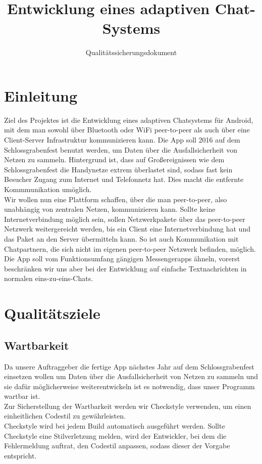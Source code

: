 \documentclass[accentcolor=tud0b,12pt,paper=a4]{tudreport}
\title{Entwicklung eines adaptiven Chat-Systems}
\subtitle{Qualitätssicherungsdokument}
\begin{document}
	\maketitle
	\tableofcontents 
	
	\chapter{Einleitung}
        Ziel des Projektes ist die Entwicklung eines adaptiven Chatsystems für Android, mit dem man sowohl über Bluetooth oder WiFi peer-to-peer als auch über eine Client-Server Infrastruktur kommunizieren kann. Die App soll 2016 auf dem Schlossgrabenfest benutzt werden, um Daten über die Ausfallsicherheit von Netzen zu sammeln. Hintergrund ist, dass auf Großereignissen wie dem Schlossgrabenfest die Handynetze extrem überlastet sind, sodass fast kein Besucher Zugang zum Internet und Telefonnetz hat. Dies macht die entfernte Kommmunikation umöglich.\\

        Wir wollen nun eine Plattform schaffen, über die man peer-to-peer, also unabhängig von zentralen Netzen, kommunizieren kann. Sollte keine Internetverbindung möglich sein, sollen Netzwerkpakete über das peer-to-peer Netzwerk weitergereicht werden, bis ein Client eine Internetverbindung hat und das Paket an den Server übermitteln kann. So ist auch Kommunikation mit Chatpartnern, die sich nicht im eigenen peer-to-peer Netzwerk befinden, möglich. Die App soll vom Funktionsumfang gängigen Messengerapps ähneln, vorerst beschränken wir uns aber bei der Entwicklung auf einfache Textnachrichten in normalen eins-zu-eins-Chats.
	
	\chapter{Qualitätsziele}
        \section{Wartbarkeit}
    
		Da unsere Auftraggeber die fertige App nächstes Jahr auf dem Schlossgrabenfest einsetzen wollen um Daten über die Ausfallsicherheit von Netzen zu sammeln und sie dafür möglicherweise weiterentwickeln ist es notwendig, dass unser Programm wartbar ist.\\

		Zur Sicherstellung der Wartbarkeit werden wir Checkstyle verwenden, um einen einheitlichen Codestil zu gewährleisten.\\
                Checkstyle wird bei jedem Build automatisch ausgeführt werden. Sollte Checkstyle eine Stilverletzung melden, wird der Entwickler, bei dem die Fehlermeldung auftrat, den Codestil anpassen, sodass dieser der Vorgabe entspricht.\\
\end{document}
